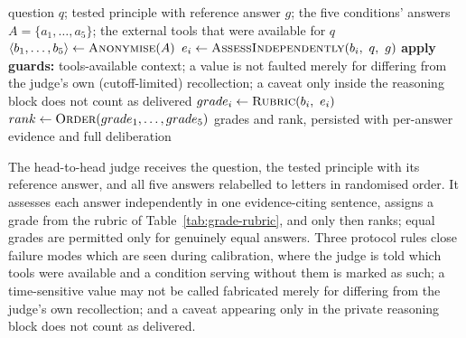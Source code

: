 \begin{algorithm}[htbp]
\caption{Head-to-head judging of one benchmark question, first a grade, then a rank.}
\label{alg:comparative-judge}
\begin{algorithmic}[1]
  \Require question $q$; tested principle with reference answer $g$; the five conditions' answers
    $A=\{a_1,\dots,a_5\}$; the external tools that were available for $q$
  \State $\langle b_1,\dots,b_5\rangle \gets \Call{Anonymise}{A}$ 
    \State $e_i \gets \Call{AssessIndependently}{b_i,\ q,\ g}$ 
    \State \textbf{apply guards:} tools-available context; a value is not faulted merely for differing from
      the judge's own (cutoff-limited) recollection; a caveat only inside the reasoning block does not count as delivered
    \State $grade_i \gets \Call{Rubric}{b_i,\ e_i}$ 
  \EndFor
  \State $rank \gets \Call{Order}{grade_1,\dots,grade_5}$ 
  \State \Return grades and rank, persisted with per-answer evidence and full deliberation
\end{algorithmic}

\end{algorithm}

The head-to-head judge receives the question, the tested principle with its reference answer, and all five answers relabelled to letters in randomised order. It assesses each answer independently in one evidence-citing sentence, assigns a grade from the rubric of Table~\ref{tab:grade-rubric}, and only then ranks; equal grades are permitted only for genuinely equal answers. Three protocol rules close failure modes which are seen during calibration, where the judge is told which tools were available and a condition serving without them is marked as such; a time-sensitive value may not be called fabricated merely for differing from the judge's own recollection; and a caveat appearing only in the private reasoning block does not count as delivered.

